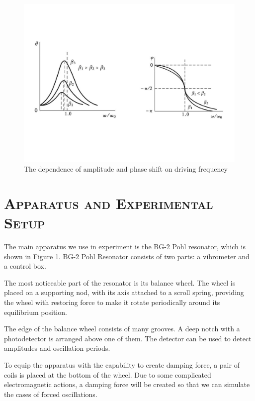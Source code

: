 \documentclass[a4paper,12pt]{article}
\begin{document}
\begin{figure}[h] 
    \centering
    \includegraphics[width=1\textwidth]{Fig1} 
    \caption{The dependence of amplitude and phase shift on driving frequency \cite{labmanual}} 
\end{figure}

\section{\textsc{Apparatus and Experimental Setup}}
The main apparatus we use in experiment is the BG-2 Pohl resonator, which is shown in Figure 1. BG-2 Pohl Resonator consists of two parts: a vibrometer and a control box.
\par 
The most noticeable part of the resonator is its balance wheel. The wheel is placed on a supporting nod, with its axis attached to a scroll spring, providing the wheel with restoring force to make it rotate periodically around its equilibrium position.
\par
The edge of the balance wheel consists of many grooves. A deep notch with a photodetector is arranged above one of them. The detector can be used to detect amplitudes and oscillation periods.
\par 
To equip the apparatus with the capability to create damping force, a pair of coils is placed at the bottom of the wheel. Due to some complicated electromagnetic actions, a damping force will be created so that we can simulate the cases of forced oscillations. 
\end{document}
